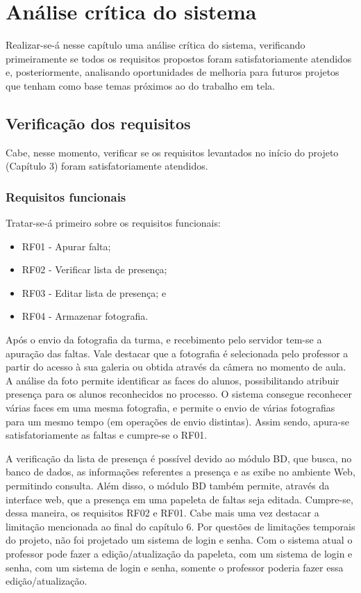 \chapter{Análise crítica do sistema}
\noindent
Realizar-se-á nesse capítulo uma análise crítica do sistema, verificando primeiramente se todos os requisitos propostos foram satisfatoriamente atendidos e, posteriormente, analisando oportunidades de melhoria para futuros projetos que tenham como base temas próximos ao do trabalho em tela. 
\section{Verificação dos requisitos}
Cabe, nesse momento, verificar se os requisitos levantados no início do projeto (Capítulo 3) foram satisfatoriamente atendidos.
\subsection{Requisitos funcionais}
Tratar-se-á primeiro sobre os requisitos funcionais:
\begin{itemize}
\item RF01 - Apurar falta; 
\item RF02 - Verificar lista de presença; 
\item RF03 - Editar lista de presença; e 
\item RF04 - Armazenar fotografia.
\end{itemize}

Após o envio da fotografia da turma, e recebimento pelo servidor tem-se a apuração das faltas. Vale destacar que a fotografia é selecionada pelo professor a partir do acesso à sua galeria ou obtida através da câmera no momento de aula. A análise da foto permite identificar as faces do alunos, possibilitando atribuir presença para os alunos reconhecidos no processo. O sistema consegue reconhecer várias faces em uma mesma fotografia, e permite o envio de várias fotografias para um mesmo tempo (em operações de envio distintas). Assim sendo, apura-se satisfatoriamente as faltas e cumpre-se o RF01. 

A verificação da lista de presença é possível devido ao módulo BD, que busca, no banco de dados, as informações referentes a presença e as exibe no ambiente Web, permitindo consulta. Além disso, o módulo BD também permite, através da interface web, que a presença em uma papeleta de faltas seja editada. Cumpre-se, dessa maneira, os requisitos RF02 e RF01. Cabe mais uma vez destacar a limitação mencionada ao final do capítulo 6. Por questões de limitações temporais do projeto, não foi projetado um sistema de login e senha. Com o sistema atual o professor pode fazer a edição/atualização da papeleta, com um sistema de login e senha, com um sistema de login e senha, somente o professor poderia fazer essa edição/atualização.

